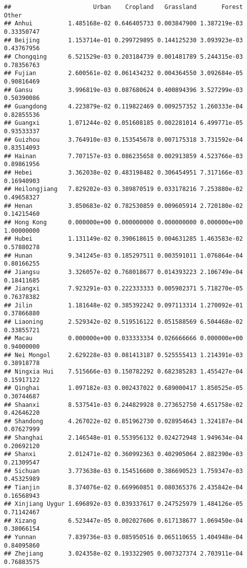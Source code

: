 \documentclass[
]{article}
\begin{document}
\begin{verbatim}
##                       Urban    Cropland   Grassland       Forest      Other
## Anhui          1.485168e-02 0.646405733 0.003847900 1.387219e-03 0.33350747
## Beijing        1.153714e-01 0.299729895 0.144125230 3.093923e-03 0.43767956
## Chongqing      6.521529e-03 0.203184739 0.001481789 5.244315e-03 0.78356763
## Fujian         2.600561e-02 0.061434232 0.004364550 3.092684e-05 0.90816469
## Gansu          3.996819e-03 0.087680624 0.400894396 3.527299e-03 0.50390086
## Guangdong      4.223879e-02 0.119822469 0.009257352 1.260333e-04 0.82855536
## Guangxi        1.071244e-02 0.051608185 0.002281014 6.499771e-05 0.93533337
## Guizhou        3.764910e-03 0.153545678 0.007175318 3.731592e-04 0.83514093
## Hainan         7.707157e-03 0.086235658 0.002913859 4.523766e-03 0.89861956
## Hebei          3.362038e-02 0.483198482 0.306454951 7.317166e-03 0.16940903
## Heilongjiang   7.829202e-03 0.389870519 0.033178216 7.253880e-02 0.49658327
## Henan          3.850683e-02 0.782530859 0.009605914 2.720180e-02 0.14215460
## Hong Kong      0.000000e+00 0.000000000 0.000000000 0.000000e+00 1.00000000
## Hubei          1.131149e-02 0.390618615 0.004631285 1.463583e-02 0.57880278
## Hunan          9.341245e-03 0.185297511 0.003591011 1.076864e-04 0.80166255
## Jiangsu        3.326057e-02 0.768018677 0.014393223 2.106749e-04 0.18411685
## Jiangxi        7.923291e-03 0.222333333 0.005902371 5.718270e-05 0.76378382
## Jilin          1.181648e-02 0.385392242 0.097113314 1.270092e-01 0.37866880
## Liaoning       2.529342e-02 0.519516122 0.051588569 6.504468e-02 0.33855721
## Macau          0.000000e+00 0.033333334 0.026666666 0.000000e+00 0.94000000
## Nei Mongol     2.629228e-03 0.081413187 0.525555413 1.214391e-03 0.38918778
## Ningxia Hui    7.515666e-03 0.150782292 0.682385283 1.455427e-04 0.15917122
## Qinghai        1.097182e-03 0.002437022 0.689000417 1.850525e-05 0.30744687
## Shaanxi        8.537541e-03 0.244829928 0.273652750 4.651758e-02 0.42646220
## Shandong       4.267022e-02 0.851962730 0.028954643 1.324187e-04 0.07627999
## Shanghai       2.146548e-01 0.553956132 0.024272948 1.949634e-04 0.20692120
## Shanxi         2.012471e-02 0.360992363 0.402905064 2.882390e-03 0.21309547
## Sichuan        3.773638e-03 0.154516600 0.386690523 1.759347e-03 0.45325989
## Tianjin        8.374076e-02 0.669960851 0.080365376 2.435842e-04 0.16568943
## Xinjiang Uygur 1.696892e-03 0.039337617 0.247525979 1.484126e-05 0.71142467
## Xizang         6.523447e-05 0.002027606 0.617138677 1.069450e-04 0.38066154
## Yunnan         7.839736e-03 0.085950516 0.065110655 1.404948e-04 0.84095860
## Zhejiang       3.024358e-02 0.193322905 0.007327374 2.703911e-04 0.76883575
\end{verbatim}
\end{document}
